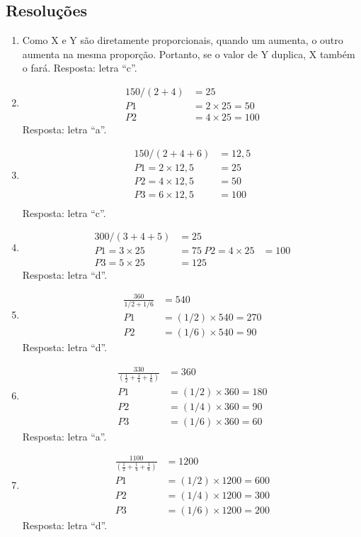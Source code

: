 \subsection{Resoluções}
\begin{enumerate}
\item Como X e Y são diretamente proporcionais, quando um aumenta, o outro aumenta na mesma proporção. Portanto, se o valor de Y duplica, X também o fará.
Resposta: letra “c”.
\item \begin{align*}
150 / (2+4) &= 25\\
P1 &= 2 \times 25 = 50\\
P2 &= 4 \times 25 = 100
\end{align*}
Resposta: letra “a”.
\item \begin{align*}
150 / (2+4+6) &= 12,5\\
P1 = 2 \times 12,5 &= 25\\
P2 = 4 \times 12,5 &= 50\\
P3 = 6 \times 12,5 &= 100\\
\end{align*}
Resposta: letra “c”.
\item \begin{align*}
300 / (3+4+5) &= 25\\
P1 = 3 \times 25 &= 75\
P2 = 4 \times 25 &= 100\\
P3 = 5 \times 25 &= 125
\end{align*}
Resposta: letra “d”.
\item \begin{align*}
\frac{360}{1/2+1/6} &= 540\\
P1 &= (1/2) \times 540 = 270\\
P2 &= (1/6) \times 540 = 90
\end{align*}
Resposta: letra “d”.
\item \begin{align*}
\frac{330}{(\frac{1}{2} +\frac{1}{4}+\frac{1}{6})} &= 360\\
P1 &= (1/2) \times 360 = 180\\
P2 &= (1/4) \times 360 = 90\\
P3 &= (1/6) \times 360 = 60
\end{align*}
Resposta: letra “a”.
\item \begin{align*}
\frac{1100}{(\frac{1}{2} +\frac{1}{4}+\frac{1}{6})} &= 1200\\
P1 &= (1/2) \times 1200 = 600\\
P2 &= (1/4) \times 1200 = 300\\
P3 &= (1/6) \times 1200 = 200
\end{align*}
Resposta: letra “d”.
\end{enumerate}

